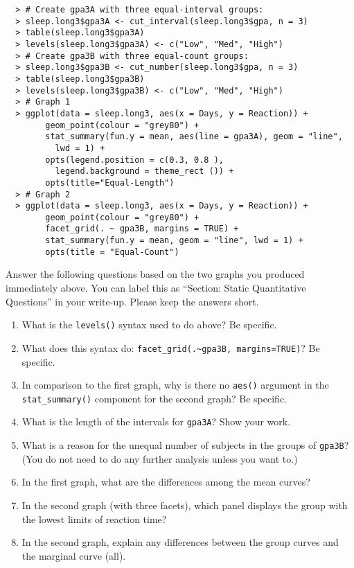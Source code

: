 \documentclass[]{article}
\begin{document}
\begin{verbatim}
  > # Create gpa3A with three equal-interval groups:
  > sleep.long3$gpa3A <- cut_interval(sleep.long3$gpa, n = 3)
  > table(sleep.long3$gpa3A)
  > levels(sleep.long3$gpa3A) <- c("Low", "Med", "High")
  > # Create gpa3B with three equal-count groups:
  > sleep.long3$gpa3B <- cut_number(sleep.long3$gpa, n = 3)
  > table(sleep.long3$gpa3B)
  > levels(sleep.long3$gpa3B) <- c("Low", "Med", "High")
  > # Graph 1
  > ggplot(data = sleep.long3, aes(x = Days, y = Reaction)) + 
        geom_point(colour = "grey80") +
        stat_summary(fun.y = mean, aes(line = gpa3A), geom = "line", 
          lwd = 1) +
        opts(legend.position = c(0.3, 0.8 ), 
          legend.background = theme_rect ()) +
        opts(title="Equal-Length")
  > # Graph 2
  > ggplot(data = sleep.long3, aes(x = Days, y = Reaction)) +
        geom_point(colour = "grey80") +
        facet_grid(. ~ gpa3B, margins = TRUE) + 
        stat_summary(fun.y = mean, geom = "line", lwd = 1) +
        opts(title = "Equal-Count")
\end{verbatim}

\noindent Answer the following questions based on the two graphs you produced immediately above. You can label this as ``Section: Static Quantitative Questions'' in your write-up. Please keep the answers short.

\begin{enumerate}[resume]
\item What is the \texttt{levels()} syntax used to do above? Be specific. 
\item What does this syntax do: \verb|facet_grid(.~gpa3B, margins=TRUE)|? Be specific. 
\item In comparison to the first graph, why is there no \texttt{aes()} argument in the \verb|stat_summary()| component for the second graph? Be specific.
\item What is the length of the intervals for  \texttt{gpa3A}? Show your work. 
\item What is a reason for the unequal number of subjects in the groups of \texttt{gpa3B}? (You do not need to do any further analysis unless you want to.)
\item In the first graph, what are the differences among the mean curves?
\item In the second graph (with three facets), which panel displays the group with the lowest limits of reaction time?
\item In the second graph, explain any differences between the group curves and the marginal curve (all).
\end{enumerate}
\end{document}
